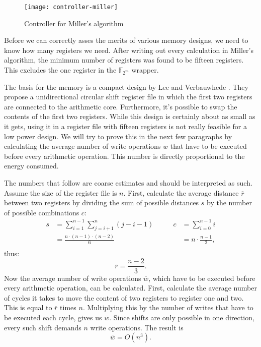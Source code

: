 \begin{figure}[h]
	\centering
		\texttt{[image: controller-miller]}
		\caption{Controller for Miller's algorithm\label{figure-controller}}
\end{figure}

Before we can correctly asses the merits of various memory designs, we need to know how many registers we need. After writing out every calculation in Miller's algorithm, the minimum number of registers was found to be fifteen registers. This excludes the one register in the $\mathbb{F}_{2^m}$ wrapper. 

The basis for the memory is a compact design by Lee and Verbauwhede \cite{lee}. They propose a unidirectional circular shift register file in which the first two registers are connected to the arithmetic core. Furthermore, it's possible to swap the contents of the first two registers. While this design is certainly about as small as it gets, using it in a register file with fifteen registers is not really feasible for a low power design. We will try to prove this in the next few paragraphs by calculating the average number of write operations $\overline{w}$ that have to be executed before every arithmetic operation. This number is directly proportional to the energy consumed.

The numbers that follow are coarse estimates and should be interpreted as such. Assume the size of the register file is $n$. First, calculate the average distance $\overline{r}$ between two registers by dividing the sum of possible distances $s$ by the number of possible combinations $c$:
\begin{displaymath}\begin{aligned}
	s	&= \sum_{i = 1}^{n - 1} \sum_{j = i + 1}^n (j - i - 1)
		&\qquad c	&= \sum_{i = 0}^{n - 1} i\\
		&= \frac{n \cdot (n - 1) \cdot (n - 2)}{6}
		&	&= n \cdot \frac{n - 1}{2},\\
\end{aligned}\end{displaymath}
thus:
\begin{displaymath}\overline{r}	= \frac{n - 2}{3}.\end{displaymath}
Now the average number of write operations $\overline{w}$, which have to be executed before every arithmetic operation, can be calculated. First, calculate the average number of cycles it takes to move the content of two registers to register one and two. This is equal to $\overline{r}$ times $n$. Multiplying this by the number of writes that have to be executed each cycle, gives us $\overline w$. Since shifts are only possible in one direction, every such shift demands $n$ write operations. The result is
\begin{displaymath}
	\overline{w} = O ( n^3 ).
\end{displaymath}

